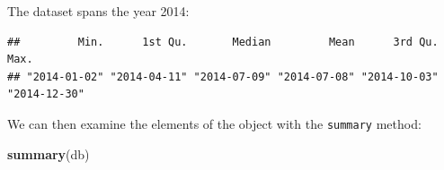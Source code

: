 \documentclass[
]{book}
\newenvironment{Shaded}{\begin{snugshade}}{\end{snugshade}}
\newcommand{\CommentTok}[1]{\textcolor[rgb]{0.56,0.35,0.01}{\textit{#1}}}
\newcommand{\KeywordTok}[1]{\textcolor[rgb]{0.13,0.29,0.53}{\textbf{#1}}}
\newcommand{\NormalTok}[1]{#1}
\newcommand{\OperatorTok}[1]{\textcolor[rgb]{0.81,0.36,0.00}{\textbf{#1}}}
\newcommand{\StringTok}[1]{\textcolor[rgb]{0.31,0.60,0.02}{#1}}
\begin{document}
The dataset spans the year 2014:

\begin{Shaded}
\end{Shaded}

\begin{verbatim}
##         Min.      1st Qu.       Median         Mean      3rd Qu.         Max. 
## "2014-01-02" "2014-04-11" "2014-07-09" "2014-07-08" "2014-10-03" "2014-12-30"
\end{verbatim}

We can then examine the elements of the object with the \texttt{summary} method:

\begin{Shaded}
\begin{Highlighting}[]
\KeywordTok{summary}\NormalTok{(db)}
\end{Highlighting}
\end{Shaded}
\end{document}
